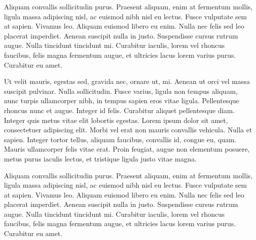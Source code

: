 \documentclass[11pt]{article}
\begin{document}
Aliquam convallis sollicitudin purus. Praesent aliquam, enim at
fermentum mollis, ligula massa adipiscing nisl, ac euismod nibh nisl eu
lectus. Fusce vulputate sem at sapien. Vivamus leo. Aliquam euismod
libero eu enim. Nulla nec felis sed leo placerat imperdiet. Aenean
suscipit nulla in justo. Suspendisse cursus rutrum augue. Nulla
tincidunt tincidunt mi. Curabitur iaculis, lorem vel rhoncus faucibus,
felis magna fermentum augue, et ultricies lacus lorem varius purus.
Curabitur eu amet.


Ut velit mauris, egestas sed, gravida nec, ornare ut, mi. Aenean ut orci
vel massa suscipit pulvinar. Nulla sollicitudin. Fusce varius, ligula
non tempus aliquam, nunc turpis ullamcorper nibh, in tempus sapien eros
vitae ligula. Pellentesque rhoncus nunc et augue. Integer id felis.
Curabitur aliquet pellentesque diam. Integer quis metus vitae elit
lobortis egestas. Lorem ipsum dolor sit amet, consectetuer adipiscing
elit. Morbi vel erat non mauris convallis vehicula. Nulla et sapien.
Integer tortor tellus, aliquam faucibus, convallis id, congue eu, quam.
Mauris ullamcorper felis vitae erat. Proin feugiat, augue non elementum
posuere, metus purus iaculis lectus, et tristique ligula justo vitae
magna.

Aliquam convallis sollicitudin purus. Praesent aliquam, enim at
fermentum mollis, ligula massa adipiscing nisl, ac euismod nibh nisl eu
lectus. Fusce vulputate sem at sapien. Vivamus leo. Aliquam euismod
libero eu enim. Nulla nec felis sed leo placerat imperdiet. Aenean
suscipit nulla in justo. Suspendisse cursus rutrum augue. Nulla
tincidunt tincidunt mi. Curabitur iaculis, lorem vel rhoncus faucibus,
felis magna fermentum augue, et ultricies lacus lorem varius purus.
Curabitur eu amet.


\nocite{SudretHDR}




\end{document}
